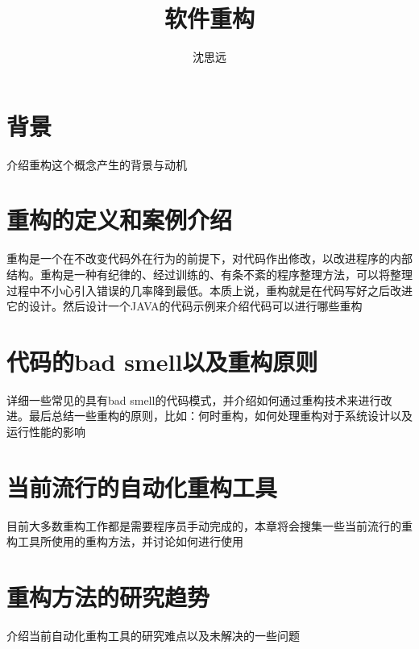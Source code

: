 \documentclass[UTF8]{ctexart}
\title{软件重构}
\author{沈思远}
\begin{document}
\maketitle
\tableofcontents
\section{背景}
介绍重构这个概念产生的背景与动机
\section{重构的定义和案例介绍}
重构是一个在不改变代码外在行为的前提下，对代码作出修改，以改进程序的内部结构。重构是一种有纪律的、经过训练的、有条不紊的程序整理方法，可以将整理过程中不小心引入错误的几率降到最低。本质上说，重构就是在代码写好之后改进它的设计。然后设计一个JAVA的代码示例来介绍代码可以进行哪些重构
\section{代码的bad smell以及重构原则}
详细一些常见的具有bad smell的代码模式，并介绍如何通过重构技术来进行改进。最后总结一些重构的原则，比如：何时重构，如何处理重构对于系统设计以及运行性能的影响
\section{当前流行的自动化重构工具}
目前大多数重构工作都是需要程序员手动完成的，本章将会搜集一些当前流行的重构工具所使用的重构方法，并讨论如何进行使用
\section{重构方法的研究趋势}
介绍当前自动化重构工具的研究难点以及未解决的一些问题
\end{document}
